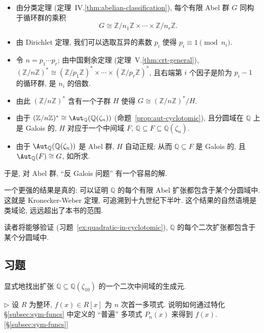 \begin{itemize}
\item 由分类定理 (定理~IV.\ref{thm:abelian-classification}), 每个有限 Abel 群 $G$ 同构于循环群的乘积
\[
G\cong\mathbb{Z}/n_1\mathbb{Z}\times\cdots\times\mathbb{Z}/n_r\mathbb{Z}.
\]
\item 由 Dirichlet 定理, 我们可以选取互异的素数 $p_i$ 使得 $p_i\equiv 1\pmod{n_i}$.
\item 令 $n=p_1\cdots p_r$; 由中国剩余定理 (定理~V.\ref{thm:crt-general}), $(\mathbb{Z}/n\mathbb{Z})^*\cong(\mathbb{Z}/p_1\mathbb{Z})^*\times\cdots\times(\mathbb{Z}/p_r\mathbb{Z})^*$, 且右端第 $i$ 个因子是阶为 $p_i-1$ 的循环群, 是 $n_i$ 的倍数.
\item 由此 $(\mathbb{Z}/n\mathbb{Z})^*$ 含有一个子群 $H$ 使得 $G\cong(\mathbb{Z}/n\mathbb{Z})^*/H$.
\item 由于 $(\mathbb{Z}/n\mathbb{Z})^*\cong\Aut_{\mathbb{Q}}(\mathbb{Q}(\zeta_n))$ (命题~\ref{prop:aut-cyclotomic}), 且分圆域在 $\mathbb{Q}$ 上是 Galois 的, $H$ 对应于一个中间域 $F$, $\mathbb{Q}\subseteq F\subseteq\mathbb{Q}(\zeta_n)$.
\item 由于 $\Aut_{\mathbb{Q}}(\mathbb{Q}(\zeta_n))$ 是 Abel 群, $H$ 自动正规; 从而 $\mathbb{Q}\subseteq F$ 是 Galois 的, 且 $\Aut_{\mathbb{Q}}(F)\cong G$, 如所求.
\end{itemize}

于是, 对 Abel 群, ``反 Galois 问题'' 有一个容易的解.

一个更强的结果是真的: 可以证明 $\mathbb{Q}$ 的每个有限 Abel 扩张都包含于某个分圆域中. 这就是 Kronecker-Weber 定理, 可追溯到十九世纪下半叶. 这个结果的自然语境是类域论, 远远超出了本书的范围.

读者将能够验证 (习题~\ref{ex:quadratic-in-cyclotomic}), $\mathbb{Q}$ 的每个二次扩张都包含于某个分圆域中.

\subsection*{习题}
{}

\begin{prob}\label{ex:quadratic-intermediate-10}
显式地找出扩张 $\mathbb{Q}\subseteq\mathbb{Q}(\zeta_{10})$ 的一个二次中间域的生成元.
\end{prob}

\begin{prob}\label{ex:universal-poly-specialize}
$\triangleright$ 设 $R$ 为整环, $f(x)\in R[x]$ 为 $n$ 次首一多项式. 说明如何通过特化 §\ref{subsec:sym-funcs} 中定义的 ``普遍'' 多项式 $P_n(x)$ 来得到 $f(x)$. [§\ref{subsec:sym-funcs}]
\end{prob}

